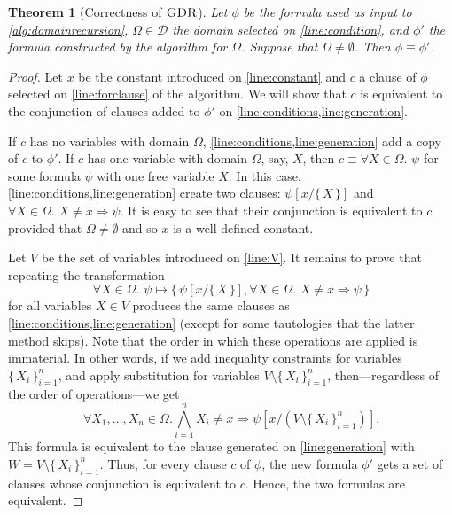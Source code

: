 \documentclass{article}
\newtheorem{theorem}{Theorem}
\DeclareMathOperator{\GDR}{\textsc{GDR}}
\begin{document}
\begin{theorem}[Correctness of $\GDR$]
  Let $\phi$ be the formula used as input to \cref{alg:domainrecursion},
  $\Omega \in \mathcal{D}$ the domain selected on \cref{line:condition}, and
  $\phi'$ the formula constructed by the algorithm for $\Omega$. Suppose that
  $\Omega \ne \emptyset$. Then $\phi \equiv \phi'$.
\end{theorem}
\begin{proof}
  Let $x$ be the constant introduced on \cref{line:constant} and $c$ a clause of
  $\phi$ selected on \cref{line:forclause} of the algorithm. We will show that
  $c$ is equivalent to the conjunction of clauses added to $\phi'$ on
  \cref{line:conditions,line:generation}.

  If $c$ has no variables with domain $\Omega$,
  \cref{line:conditions,line:generation} add a copy of $c$ to $\phi'$. If $c$
  has one variable with domain $\Omega$, say, $X$, then
  $c \equiv \forall X \in \Omega\text{. } \psi$ for some formula $\psi$ with one
  free variable $X$. In this case, \cref{line:conditions,line:generation} create
  two clauses: $\psi[x/\{\, X \,\}]$ and $\forall X \in \Omega\text{.
  } X \ne x \Rightarrow \psi$. It is easy to see that their conjunction is
  equivalent to $c$ provided that $\Omega \ne \emptyset$ and so $x$ is a
  well-defined constant.

  Let $V$ be the set of variables introduced on \cref{line:V}. It remains to
  prove that repeating the transformation
  \[
    \forall X \in \Omega\text{. } \psi \mapsto \{\, \psi[x/\{\, X \,\}], \forall X \in \Omega\text{. } X \ne x \Rightarrow \psi \,\}
  \]
  for all variables $X \in V$ produces the same clauses as
  \cref{line:conditions,line:generation} (except for some tautologies that the
  latter method skips). Note that the order in which these operations are
  applied is immaterial. In other words, if we add inequality constraints for
  variables ${\{\, X_{i} \,\}}_{i=1}^{n}$, and apply substitution for variables
  $V \setminus {\{\, X_{i} \,\}}_{i=1}^{n}$, then---regardless of the order of
  operations---we get
  \[
    \forall X_{1}, \dots, X_{n} \in \Omega\text{.} \bigwedge_{i=1}^{n} X_{i} \ne x \Rightarrow \psi\left[x / \left(V \setminus {\{\, X_{i} \,\}}_{i=1}^{n}\right)\right].
  \]
  This formula is equivalent to the clause generated on \cref{line:generation}
  with $W = V \setminus {\{\, X_{i} \,\}}_{i=1}^{n}$. Thus, for every clause $c$
  of $\phi$, the new formula $\phi'$ gets a set of clauses whose conjunction is
  equivalent to $c$. Hence, the two formulas are equivalent.
\end{proof}
\end{document}
